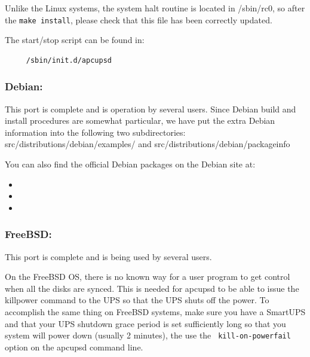 Unlike the Linux systems, the system halt routine is located in /sbin/rc0, so
after the {\tt make install}, please check that this file has been correctly
updated.  

The start/stop script can be found in: 

\footnotesize
\begin{verbatim}
     /sbin/init.d/apcupsd
\end{verbatim}
\normalsize

\label{Debian}

\subsubsection*{Debian:}

\label{index-Debian-34}
\label{index-OS_002c-Debian-35}
This port is complete and is operation by several users. Since Debian build
and install procedures are somewhat particular, we have put the extra Debian
information into the following two subdirectories:
\lt{}src\gt{}/distributions/debian/examples/ and
\lt{}src\gt{}/distributions/debian/packageinfo  

You can also find the official Debian packages on the Debian site at:  

\begin{itemize}
\item 
\item 
\item 
\end{itemize}

\label{FreeBSD}

\subsubsection*{FreeBSD:}

\label{index-FreeBSD-36}
\label{index-OS_002c-FreeBSD-37}
This port is complete and is being used by several users.

On the FreeBSD OS, there is no known way for a user program to get control
when all the disks are synced. This is needed for apcupsd to be able to issue
the killpower command to the UPS so that the UPS shuts off the power. To
accomplish the same thing on FreeBSD systems, make sure you have a SmartUPS
and that your UPS shutdown grace period is set sufficiently long so that you
system will power down (usually 2 minutes), the use the {\tt
kill-on-powerfail} option on the apcupsd command line.  

